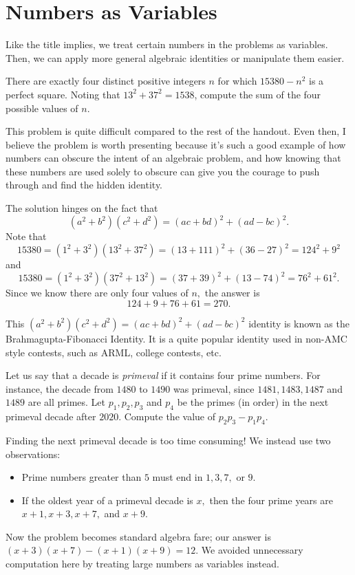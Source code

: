 \documentclass{article}
\begin{document}
\section{Numbers as Variables}
Like the title implies, we treat certain numbers in the problems as variables. Then, we can apply more general algebraic identities or manipulate them easier.
\begin{exam}[SMT 2021/N5]
There are exactly four distinct positive integers $n$ for which $15380 - n^2$ is a perfect square. Noting that $13^2 + 37^2 = 1538$, compute the sum of the four possible values of $n$.
\end{exam}

This problem is quite difficult compared to the rest of the handout. Even then, I believe the problem is worth presenting because it's such a good example of how numbers can obscure the intent of an algebraic problem, and how knowing that these numbers are used solely to obscure can give you the courage to push through and find the hidden identity.

\begin{sol}
The solution hinges on the fact that
\[(a^2+b^2)(c^2+d^2)=(ac+bd)^2+(ad-bc)^2.\]
Note that
\[15380=(1^2+3^2)(13^2+37^2)=(13+111)^2+(36-27)^2=124^2+9^2\]
and
\[15380=(1^2+3^2)(37^2+13^2)=(37+39)^2+(13-74)^2=76^2+61^2.\]
Since we know there are only four values of $n,$ the answer is
\[124+9+76+61=270.\]
\end{sol}

This $(a^2+b^2)(c^2+d^2)=(ac+bd)^2+(ad-bc)^2$ identity is known as the Brahmagupta-Fibonacci Identity. It is a quite popular identity used in non-AMC style contests, such as ARML, college contests, etc.

\begin{exam}[2017-2018 Mandelbrot]
Let us say that a decade is \emph{primeval} if it contains four prime numbers. For instance, the decade from $1480$ to $1490$ was primeval, since $1481, 1483, 1487$ and $1489$ are all primes. Let $p_1,p _2, p_3$ and $p_4$ be the primes (in order) in the  next primeval decade after $2020.$ Compute the value of $p_2 p_3-p_1 p_4$.
\end{exam}

\begin{sol}
Finding the next primeval decade is too time consuming! We instead use two observations:
\begin{itemize}
\item Prime numbers greater than $5$ must end in $1,3,7,$ or $9.$
\item If the oldest year of a primeval decade is $x,$ then the four prime years are $x+1,x+3,x+7,$ and $x+9.$
\end{itemize}
Now the problem becomes standard algebra fare; our answer is $(x+3)(x+7)-(x+1)(x+9) = 12.$ We avoided unnecessary computation here by treating large numbers as variables instead.
\end{sol}
\end{document}
